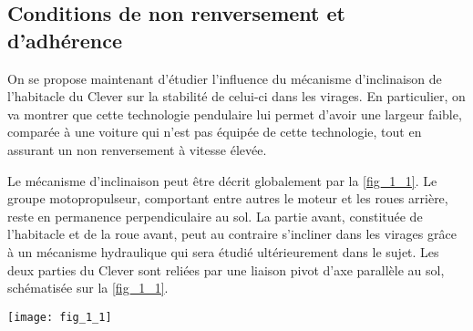\begin{multicols}{2}
% 
%
%

\subsection{Conditions de non renversement et d'adhérence}
On se propose maintenant d'étudier l'influence du mécanisme d'inclinaison de l'habitacle du Clever sur la stabilité de celui-ci dans les virages. En particulier, on va montrer que cette technologie pendulaire lui permet d'avoir une largeur faible, comparée à une voiture qui n'est pas équipée de cette technologie, tout en assurant un non renversement à vitesse élevée.

Le mécanisme d'inclinaison peut être décrit globalement par la \autoref{fig_1_1}. Le groupe motopropulseur, comportant entre autres le moteur et les roues arrière, reste en permanence perpendiculaire au sol. La partie avant, constituée de l'habitacle et de la roue avant, peut au contraire s'incliner dans les virages grâce à un mécanisme hydraulique qui sera étudié ultérieurement dans le sujet. Les deux parties du Clever sont reliées par une liaison pivot d'axe parallèle au sol, schématisée sur la \autoref{fig_1_1}.

\begin{center}%
\texttt{[image: fig\_1\_1]}


\end{center}
\end{multicols}
